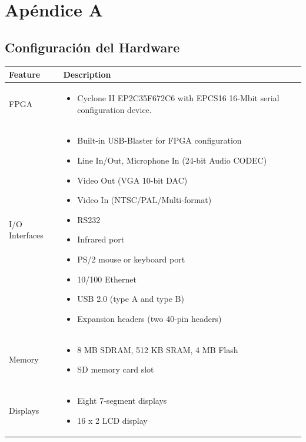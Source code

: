 \chapter{Apéndice A}

\section*{Configuración del Hardware}

\begin{center}
	\begin{longtable}{|l|p{4.75in}|} \hline
		\textbf{Feature} & \textbf{Description} \\ \hline
		FPGA & \begin{itemize}
			\item Cyclone II EP2C35F672C6 with EPCS16 16-Mbit serial configuration device.
			\end{itemize} \\ \hline
		I/O Interfaces &     \begin{itemize}
					\item Built-in USB-Blaster for FPGA configuration
    					\item Line In/Out, Microphone In (24-bit Audio CODEC)
   					\item Video Out (VGA 10-bit DAC)
   					\item Video In (NTSC/PAL/Multi-format)
   					\item RS232
    					\item Infrared port
   					\item PS/2 mouse or keyboard port
    					\item 10/100 Ethernet
   					\item USB 2.0 (type A and type B)
    					\item Expansion headers (two 40-pin headers)
				     \end{itemize} \\ \hline
		Memory & \begin{itemize}
					\item 8 MB SDRAM, 512 KB SRAM, 4 MB Flash
    					\item SD memory card slot
    			 \end{itemize} \\ \hline
		Displays & \begin{itemize}
					\item Eight 7-segment displays
    					\item 16 x 2 LCD display
    			 \end{itemize} \\ \hline

\end{longtable}
\end{center}
